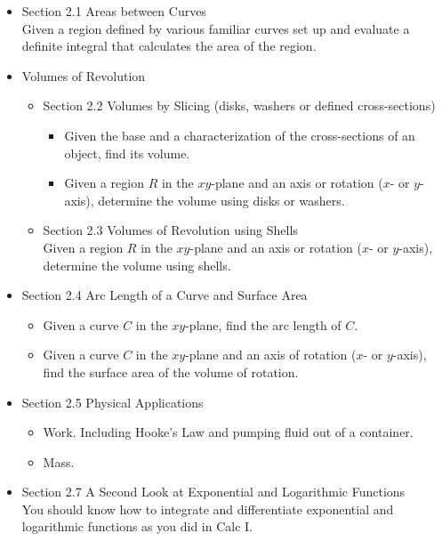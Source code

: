 \documentclass[11pt,fleqn]{article}
\begin{document}
\begin{itemize}
\item Section 2.1 Areas between Curves\\
Given a region defined by various familiar curves set up and evaluate a definite integral that calculates the area of the region.
\item Volumes of Revolution
	\begin{itemize} 
	\item Section 2.2 Volumes by Slicing (disks, washers or defined cross-sections)
		\begin{itemize}
		\item Given the base and a characterization of the cross-sections of an object, find its volume.
		\item Given a region $R$ in the $xy$-plane and an axis or rotation ($x$- or $y$-axis), determine the volume using disks or washers.
		\end{itemize}
	\item Section 2.3 Volumes of Revolution using Shells\\
Given a region $R$ in the $xy$-plane and an axis or rotation ($x$- or $y$-axis), determine the volume using shells.
	\end{itemize}
\item Section 2.4 Arc Length of a Curve and Surface Area
	\begin{itemize}
	\item Given a curve $C$ in the $xy$-plane, find the arc length of $C$. 
	\item Given a curve $C$ in the $xy$-plane and an axis of rotation ($x$- or $y$-axis), find the surface area of the volume of rotation.
	\end{itemize}
\item Section 2.5 Physical Applications
	\begin{itemize}
	\item Work. Including Hooke's Law and pumping fluid out of a container.
	\item Mass.
	\end{itemize}
\item Section 2.7 A Second Look at Exponential and Logarithmic Functions\\
You should know how to integrate and differentiate exponential and logarithmic functions as you did in Calc I.
\end{itemize}
\end{document}
